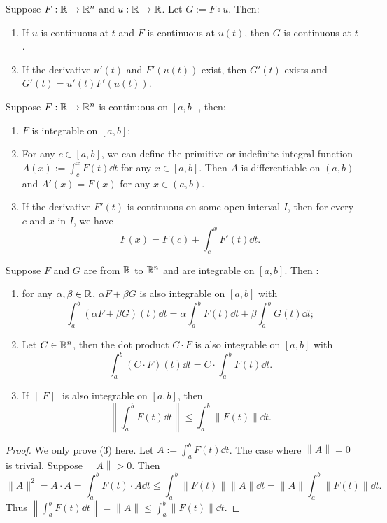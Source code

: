 \documentclass[a4paper]{ctexart}
\begin{document}
    \begin{mythm}
        Suppose $F:\mathbb{R} \to \mathbb{R}^n$ and $u:\mathbb{R} \to \mathbb{R}$. Let $G:=F \circ u$. Then:
        \begin{enumerate}[label=(\arabic*)]
            \item If $u$ is continuous at $t$ and $F$ is continuous at $u(t)$, then $G$ is continuous at $t$.
            \item If the derivative $u'(t)$ and $F'(u(t))$ exist, then $G'(t)$ exists and $G'(t) = u'(t) F'(u(t))$.
        \end{enumerate}
    \end{mythm}
    \begin{mythm}
        Suppose $F:\mathbb{R} \to \mathbb{R}^n$ is continuous on $[a,b]$, then:
        \begin{enumerate}[label=(\arabic*)]
            \item $F$ is integrable on $[a,b]$;
            \item For any $c\in [a,b]$, we can define the primitive or indefinite integral function $A(x) := \displaystyle \int_c^x F(t) \dd t$ for any $x\in [a,b]$. Then $A$ is differentiable on $(a,b)$ and $A'(x) = F(x)$ for any $x\in (a,b)$.
            \item If the derivative $F'(t)$ is continuous on some open interval $I$, then for every $c$ and $x$ in $I$, we have
            $$ F(x) = F(c) + \int_c^x F'(t) \dd t. $$
        \end{enumerate}
    \end{mythm}
    \begin{mythm}
        Suppose $F$ and $G$ are from $\mathbb{R}$ to $\mathbb{R}^n$ and are integrable on $[a,b]$. Then :
        \begin{enumerate}[label=(\arabic*)]
            \item for any $\alpha , \beta \in \mathbb{R}$, $\alpha F + \beta G$ is also integrable on $[a,b]$ with
            $$ \int_a^b (\alpha F + \beta G)(t) \dd t = \alpha \int_a^b F(t) \dd t + \beta \int_a^b G(t) \dd t; $$
            \item Let $C \in \mathbb{R}^n$, then the dot product $C \cdot F$ is also integrable on $[a,b]$ with
            $$ \int_a^b (C\cdot F)(t) \dd t = C \cdot \int_a^b F(t) \dd t. $$
            \item If $\| F \|$ is also integrable on $[a,b]$, then 
            $$ \left\| \int_a^b F(t) \dd t \right\| \le \int_a^b \| F(t)\| \dd t. $$
        \end{enumerate}
    \end{mythm}
    \begin{proof}
        We only prove (3) here. Let $A:= \displaystyle \int_a^b F(t) \dd t$. The case where $\left\|A\right\| = 0 $ is trivial. Suppose $\left\|A\right\| > 0$. Then
        $$ \| A\|^2 = A \cdot A = \int_a^b F(t) \cdot A \dd t \le \int_a^b \| F(t)\| \| A\| \dd t = \| A\| \int_a^b \| F(t)\| \dd t. $$
        Thus $\displaystyle \left\|\int_a^b F(t) \dd t\right\| = \| A\| \le \int_a^b \| F(t)\| \dd t$.
    \end{proof}
\end{document}
